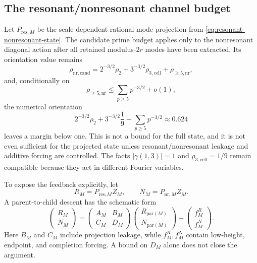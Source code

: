 \documentclass[11pt]{article}
\theoremstyle{definition}
\theoremstyle{remark}
\newcommand{\1}{\mathbf{1}}
\newcommand{\N}{\mathbb{N}}
\newcommand{\C}{\mathbb{C}}
\begin{document}
\subsection{The resonant/nonresonant channel budget}

Let $P_{\mathrm{res},M}$ be the scale-dependent rational-mode projection from
\cref{eq:resonant-nonresonant-state}.  The candidate prime budget applies only to
the nonresonant diagonal action after all retained modulus-$2r$ modes have been
extracted.  Its orientation value remains
\begin{equation}
 \rho_{\mathrm{nr,cand}}
 =2^{-3/2}\rho_2
  +3^{-3/2}\rho_{3,\mathrm{cell}}
  +\rho_{\ge5,\mathrm{nr}},
 \label{eq:candidate-budget-corrected}
\end{equation}
and, conditionally on
\begin{equation}
 \rho_{\ge5,\mathrm{nr}}
 \le\sum_{p\ge5}p^{-3/2}+o(1),
 \label{eq:pge5-budget-corrected}
\end{equation}
the numerical orientation
\begin{equation}
 2^{-3/2}\rho_2
 +3^{-3/2}\frac19
 +\sum_{p\ge5}p^{-3/2}
 \approx0.624
 \label{eq:point-six-two-four-budget}
\end{equation}
leaves a margin below one.  This is not a bound for the full state, and it is not
even sufficient for the projected state unless resonant/nonresonant leakage and
additive forcing are controlled.  The facts $|\gamma(1,3)|=1$ and
$\rho_{3,\mathrm{cell}}=1/9$ remain compatible because they act in different
Fourier variables.

To expose the feedback explicitly, let
\[
 R_M=P_{\mathrm{res},M}Z_M,
 \qquad
 N_M=P_{\mathrm{nr},M}Z_M.
\]
A parent-to-child descent has the schematic form
\begin{equation}
 \begin{pmatrix}R_M\\N_M\end{pmatrix}
 =
 \begin{pmatrix}A_M&B_M\\C_M&D_M\end{pmatrix}
 \begin{pmatrix}R_{\mathrm{par}(M)}\\N_{\mathrm{par}(M)}\end{pmatrix}
 +
 \begin{pmatrix}f_M^{R}\\f_M^{N}\end{pmatrix}.
 \label{eq:resonant-block-recursion}
\end{equation}
Here $B_M$ and $C_M$ include projection leakage, while $f_M^R,f_M^N$ contain
low-height, endpoint, and completion forcing.  A bound on $D_M$ alone does not
close the argument.
\end{document}

